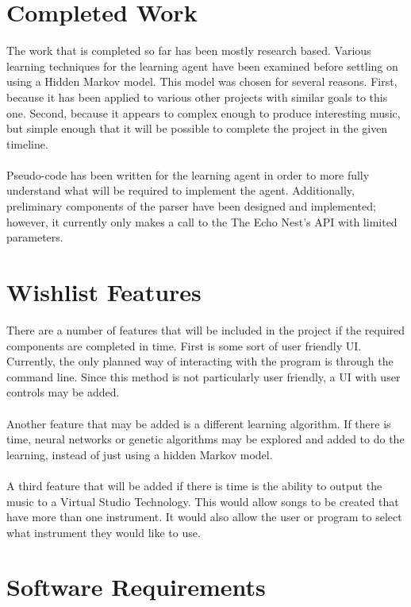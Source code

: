 \documentclass{article}
\begin{document}
\section{Completed Work}
The work that is completed so far has been mostly research based. Various learning techniques for the learning agent have been examined before settling on using a Hidden Markov model. This model was chosen for several reasons. First, because it has been applied to various other projects with similar goals to this one. Second, because it appears to complex enough to produce interesting music, but simple enough that it will be possible to complete the project in the given timeline.\\
\\
Pseudo-code has been written for the learning agent in order to more fully understand what will be required to implement the agent.  Additionally, preliminary components of the parser have been designed and implemented; however, it currently only makes a call to the The Echo Nest's API with limited parameters.

\section{Wishlist Features}
There are a number of features that will be included in the project if the required components are completed in time. First is some sort of user friendly UI. Currently, the only planned way of interacting with the program is through the command line. Since this method is not particularly user friendly, a UI with user controls may be added.\\
\\
Another feature that may be added is a different learning algorithm. If there is time, neural networks or genetic algorithms may be explored and added to do the learning, instead of just using a hidden Markov model.\\
\\
A third feature that will be added if there is time is the ability to output the music to a Virtual Studio Technology. This would allow songs to be created that have more than one instrument. It would also allow the user or program to select what instrument they would like to use.

\section{Software Requirements}
\end{document}
